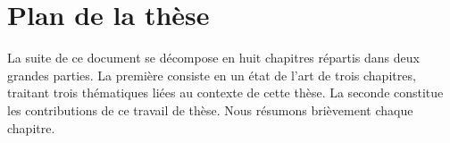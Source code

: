 
\section*{Plan de la thèse}
\label{sec:plan}

La suite de ce document se décompose en huit chapitres répartis dans deux
grandes parties. La première consiste en un état de l'art de trois chapitres,
traitant trois thématiques liées au contexte de cette thèse. La seconde
constitue les contributions de ce travail de thèse. Nous résumons brièvement
chaque chapitre.



